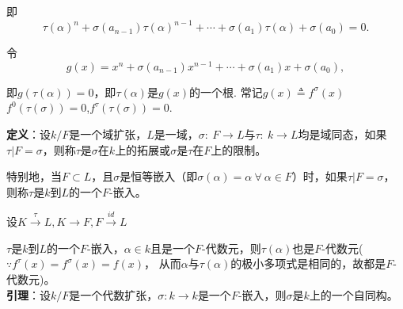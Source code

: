 \documentclass[UTF8]{article}
\begin{document}
即$$\tau\left( \alpha\right)^n+\sigma\left( a_{n-1}\right)\tau\left( \alpha\right)^{n-1}+\cdots+\sigma\left( a_1\right)\tau\left( \alpha\right)+\sigma\left( a_0\right)=0.$$

令$$g(x)=x^{n}+\sigma\left(a_{n-1}\right) x^{n-1}+\cdots+\sigma\left(a_{1}\right) x+\sigma\left(a_{0}\right),$$

即$g\left( \tau\left( \alpha\right)\right)=0$，即$\tau\left( \alpha\right)$是$g\left( x\right)$的一个根.
常记$g(x) \triangleq f^{\sigma}(x)$
$f^{0}(\tau(\sigma)) = 0$,$f^{\tau}(\tau(\sigma)) = 0.$

\textbf{定义}：设$k/F$是一个域扩张，$L$是一域，$\sigma:\ F\longrightarrow L$与$\tau:\ k\longrightarrow L$均是域同态，如果$\tau|F=\sigma$，则称$\tau$是$\sigma$在$k$上的拓展或$\sigma$是$\tau$在$F$上的限制。

特别地，当$F\subset L$，且$\sigma$是恒等嵌入（即$\sigma(\alpha)=\alpha\ \forall\ \alpha\in F$）时，如果$\tau|F=\sigma$，则称$\tau$是$k$到$L$的一个$F$-嵌入。

设$K\xrightarrow{\tau}L,K\longrightarrow F,F\xrightarrow{id}L$

$\tau$是$k$到$L$的一个$F$-嵌入，$\alpha\in k$且是一个$F$-代数元，则$\tau(\alpha)$也是$F$-代数元($\because f^\tau(x)=f^{\sigma}(x)=f(x)$，
从而$\alpha$与$\tau(\alpha)$的极小多项式是相同的，故都是$F$-代数元)。\\


\textbf{引理}：设$k/F$是一个代数扩张，$\sigma: k\longrightarrow k$是一个$F$-嵌入，则$\sigma$是$k$上的一个自同构。
\end{document}
